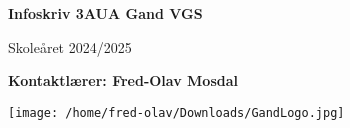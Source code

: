 \begin{titlepage}
   \begin{center}
       \vspace*{1cm}

       \textbf{Infoskriv 3AUA Gand VGS}

       \vspace{0.5cm}
        Skoleåret 2024/2025
            
       \vspace{1.5cm}

       \textbf{Kontaktlærer: Fred-Olav Mosdal}

       \vfill
            
            
     
       \texttt{[image: /home/fred-olav/Downloads/GandLogo.jpg]}
    \vfill        
            
   \end{center}
\end{titlepage}

